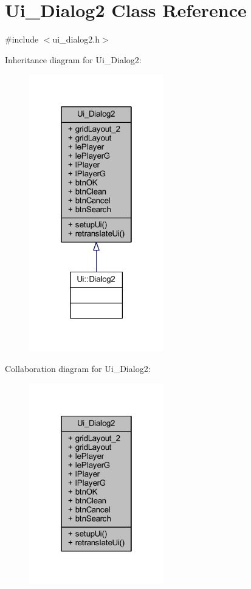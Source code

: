 \hypertarget{class_ui___dialog2}{}\section{Ui\+\_\+\+Dialog2 Class Reference}
\label{class_ui___dialog2}


{\ttfamily \#include $<$ui\+\_\+dialog2.\+h$>$}



Inheritance diagram for Ui\+\_\+\+Dialog2\+:
\nopagebreak
\begin{figure}[H]
\begin{center}
\leavevmode
\includegraphics[width=166pt]{dc/dc7/class_ui___dialog2__inherit__graph}
\end{center}
\end{figure}


Collaboration diagram for Ui\+\_\+\+Dialog2\+:
\nopagebreak
\begin{figure}[H]
\begin{center}
\leavevmode
\includegraphics[width=166pt]{d5/d3b/class_ui___dialog2__coll__graph}
\end{center}
\end{figure}
